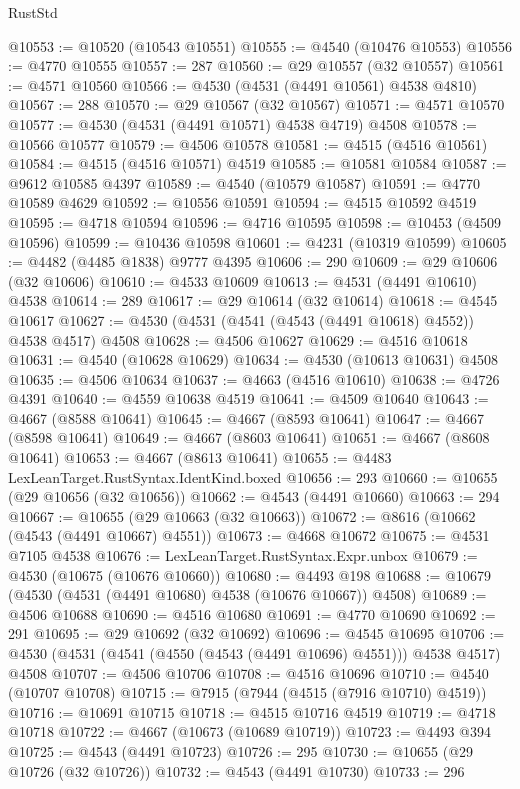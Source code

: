 \begin{lexlean}{RustStd}
\begin{coremodule}
@10553 := @10520 (@10543 @10551)
@10555 := @4540 (@10476 @10553)
@10556 := @4770 @10555
@10557 := 287
@10560 := @29 @10557 (@32 @10557)
@10561 := @4571 @10560
@10566 := @4530 (@4531 (@4491 @10561) @4538 @4810)
@10567 := 288
@10570 := @29 @10567 (@32 @10567)
@10571 := @4571 @10570
@10577 := @4530 (@4531 (@4491 @10571) @4538 @4719) @4508
@10578 := @10566 @10577
@10579 := @4506 @10578
@10581 := @4515 (@4516 @10561)
@10584 := @4515 (@4516 @10571) @4519
@10585 := @10581 @10584
@10587 := @9612 @10585 @4397
@10589 := @4540 (@10579 @10587)
@10591 := @4770 @10589 @4629
@10592 := @10556 @10591
@10594 := @4515 @10592 @4519
@10595 := @4718 @10594
@10596 := @4716 @10595
@10598 := @10453 (@4509 @10596)
@10599 := @10436 @10598
@10601 := @4231 (@10319 @10599)
@10605 := @4482 (@4485 @1838) @9777 @4395
@10606 := 290
@10609 := @29 @10606 (@32 @10606)
@10610 := @4533 @10609
@10613 := @4531 (@4491 @10610) @4538
@10614 := 289
@10617 := @29 @10614 (@32 @10614)
@10618 := @4545 @10617
@10627 := @4530 (@4531 (@4541 (@4543 (@4491 @10618) @4552)) @4538 @4517) @4508
@10628 := @4506 @10627
@10629 := @4516 @10618
@10631 := @4540 (@10628 @10629)
@10634 := @4530 (@10613 @10631) @4508
@10635 := @4506 @10634
@10637 := @4663 (@4516 @10610)
@10638 := @4726 @4391
@10640 := @4559 @10638 @4519
@10641 := @4509 @10640
@10643 := @4667 (@8588 @10641)
@10645 := @4667 (@8593 @10641)
@10647 := @4667 (@8598 @10641)
@10649 := @4667 (@8603 @10641)
@10651 := @4667 (@8608 @10641)
@10653 := @4667 (@8613 @10641)
@10655 := @4483 LexLeanTarget.RustSyntax.IdentKind.boxed
@10656 := 293
@10660 := @10655 (@29 @10656 (@32 @10656))
@10662 := @4543 (@4491 @10660)
@10663 := 294
@10667 := @10655 (@29 @10663 (@32 @10663))
@10672 := @8616 (@10662 (@4543 (@4491 @10667) @4551))
@10673 := @4668 @10672
@10675 := @4531 @7105 @4538
@10676 := LexLeanTarget.RustSyntax.Expr.unbox
@10679 := @4530 (@10675 (@10676 @10660))
@10680 := @4493 @198
@10688 := @10679 (@4530 (@4531 (@4491 @10680) @4538 (@10676 @10667)) @4508)
@10689 := @4506 @10688
@10690 := @4516 @10680
@10691 := @4770 @10690
@10692 := 291
@10695 := @29 @10692 (@32 @10692)
@10696 := @4545 @10695
@10706 := @4530 (@4531 (@4541 (@4550 (@4543 (@4491 @10696) @4551))) @4538 @4517) @4508
@10707 := @4506 @10706
@10708 := @4516 @10696
@10710 := @4540 (@10707 @10708)
@10715 := @7915 (@7944 (@4515 (@7916 @10710) @4519))
@10716 := @10691 @10715
@10718 := @4515 @10716 @4519
@10719 := @4718 @10718
@10722 := @4667 (@10673 (@10689 @10719))
@10723 := @4493 @394
@10725 := @4543 (@4491 @10723)
@10726 := 295
@10730 := @10655 (@29 @10726 (@32 @10726))
@10732 := @4543 (@4491 @10730)
@10733 := 296

\end{coremodule}
\end{lexlean}
